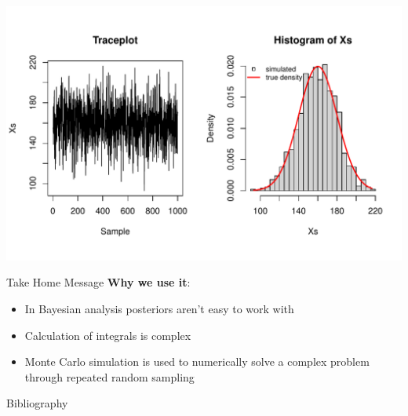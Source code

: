 \documentclass[english]{beamer}\usepackage[]{graphicx}\usepackage[]{xcolor}
\makeatletter
\def\maxwidth{ %
  \ifdim\Gin@nat@width>\linewidth
    \linewidth
  \else
    \Gin@nat@width
  \fi
}
\newenvironment{knitrout}{}{} %
\makeatother
\begin{document}
\begin{frame}[fragile]
\begin{knitrout}
\color{fgcolor}

{\centering \includegraphics[width=\maxwidth]{figures/figpart3-1} 

}


\end{knitrout}
\end{frame}


\begin{frame}{Take Home Message}
\textbf{Why we use it}: 
\begin{itemize}
\item In Bayesian analysis posteriors aren't easy to work with
\item Calculation of integrals is complex
\item Monte Carlo simulation is used to numerically solve a complex problem through repeated random sampling
\end{itemize}
\end{frame}




\begin{frame}{Bibliography}
   \footnotesize
   
   \nocite{held2014}
   \nocite{Harrison2010}
   \nocite{Marble2020}

\end{frame}

\end{document}
